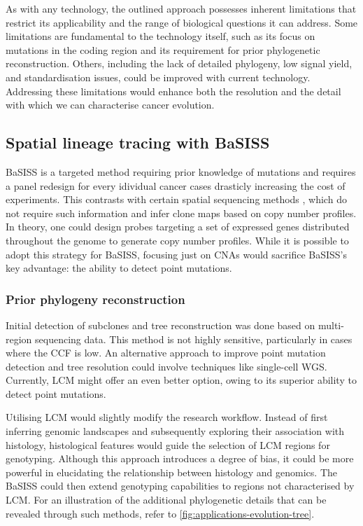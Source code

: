 As with any technology, the outlined approach possesses inherent limitations that restrict its applicability and the range of biological questions it can address. Some limitations are fundamental to the technology itself, such as its focus on mutations in the coding region and its requirement for prior phylogenetic reconstruction. Others, including the lack of detailed phylogeny, low signal yield, and standardisation issues, could be improved with current technology. Addressing these limitations would enhance both the resolution and the detail with which we can characterise cancer evolution.

\subsection{Spatial lineage tracing with \acs{BaSISS}}

\ac{BaSISS} is a targeted method requiring prior knowledge of mutations and requires a panel redesign for every idividual cancer cases drasticly increasing the cost of experiments. This contrasts with certain spatial sequencing methods \parencite{Zhao2022-xd,Erickson2022-zh}, which do not require such information and infer clone maps based on copy number profiles. In theory, one could design probes targeting a set of expressed genes distributed throughout the genome to generate copy number profiles. While it is possible to adopt this strategy for \ac{BaSISS}, focusing just on \acp{CNA} would sacrifice \ac{BaSISS}'s key advantage: the ability to detect point mutations.

\subsubsection*{Prior phylogeny reconstruction}
Initial detection of subclones and tree reconstruction was done based on multi-region sequencing data. This method is not highly sensitive, particularly in cases where the \ac{CCF} is low. An alternative approach to improve point mutation detection and tree resolution could involve techniques like single-cell \ac{WGS}. Currently, \ac{LCM} might offer an even better option, owing to its superior ability to detect point mutations.

Utilising \ac{LCM} would slightly modify the research workflow. Instead of first inferring genomic landscapes and subsequently exploring their association with histology, histological features would guide the selection of \ac{LCM} regions for genotyping. Although this approach introduces a degree of bias, it could be more powerful in elucidating the relationship between histology and genomics. The \ac{BaSISS} could then extend genotyping capabilities to regions not characterised by \ac{LCM}. For an illustration of the additional phylogenetic details that can be revealed through such methods, refer to \cref{fig:applications-evolution-tree}.

